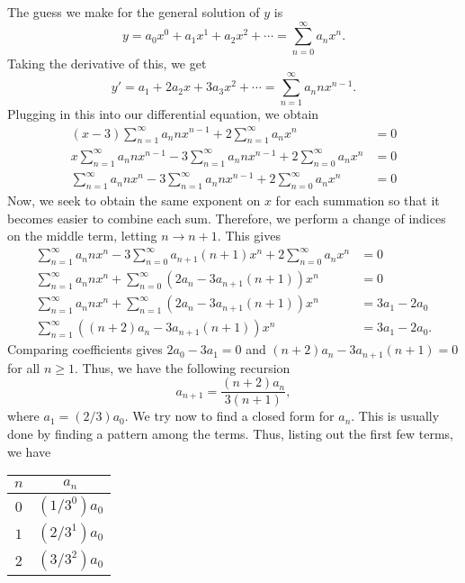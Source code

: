 \begin{soln}
    The guess we make for the general solution of $y$ is
    $$y = a_0 x^0 + a_1 x^1 + a_2 x^2 +\cdots = \sum_{n = 0}^{\infty} a_n x^n.$$
    Taking the derivative of this, we get
    $$y' = a_1+2a_2x + 3a_3x^2 + \cdots = \sum_{n = 1}^{\infty} a_n n x^{n-1}.$$
    Plugging in this into our differential equation, we obtain
    \begin{align*}
        (x-3)\sum_{n = 1}^{\infty} a_n n x^{n-1} + 2\sum_{n = 1}^{\infty} a_n x^n &= 0 \\
        x\sum_{n = 1}^{\infty} a_n n x^{n-1} - 3\sum_{n = 1}^{\infty} a_n n x^{n-1}+2\sum_{n = 0}^{\infty} a_n x^n &= 0 \\
        \sum_{n = 1}^{\infty} a_n n x^{n} - 3\sum_{n = 1}^{\infty} a_n n x^{n-1}+2\sum_{n = 0}^{\infty} a_n x^n & =0
    \end{align*}
    Now, we seek to obtain the same exponent on $x$ for each summation so that
    it becomes easier to combine each sum. Therefore, we perform a \alert{change of
    indices} on the middle term, letting $n \rightarrow n+1$. This gives
    \begin{align*}
        \sum_{n = 1}^{\infty} a_n n x^{n} - 3\sum_{n = 0}^{\infty} a_{n+1} (n+1)x^{n}+2\sum_{n = 0}^{\infty} a_n x^n &= 0\\
        \sum_{n = 1}^{\infty} a_n n x^{n} + \sum_{n = 0}^{\infty} \left(2a_n-3a_{n+1}(n+1)\right)x^n &= 0 \\
        \sum_{n = 1}^{\infty} a_n n x^{n} + \sum_{n = 1}^{\infty} \left(2a_n-3a_{n+1}(n+1)\right)x^n &= 3a_1-2a_0 \\
        \sum_{n = 1}^{\infty}\left((n+2)a_n-3a_{n+1}(n+1)\right)x^n &= 3a_1 - 2a_0.
    \end{align*}
    Comparing coefficients gives $2a_0-3a_1 = 0$ and $(n+2)a_n-3a_{n+1}(n+1) = 0$ for all
    $n \geq 1$. Thus, we have the following recursion $$a_{n+1} = \frac{(n+2)a_n}{3(n+1)},$$
    where $a_1 = (2/3)a_0$. We try now to find a closed form for $a_n$. This
    is usually done by finding a pattern among the terms. Thus, listing out
    the first few terms, we have
    \begin{center}
        \begin{tabular}{| c | c |}
            \hline
            $n$ & $a_n$ \\
            \hline
            $0$ & $(1/3^0)a_0$ \\
            $1$ & $(2/3^1)a_0$ \\
            $2$ & $(3/3^2)a_0$ \\

\end{tabular}
\end{center}
\end{soln}
